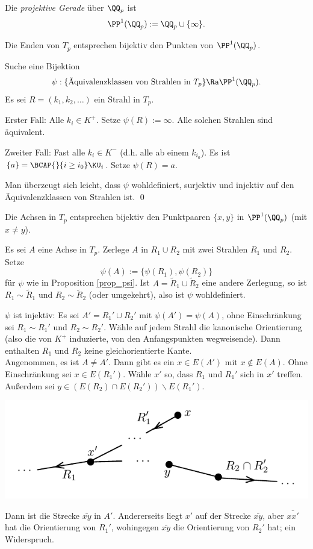 \DEF Die \emph{projektive Gerade}
über $\QQ_p$ ist
\[
\PP^1(\QQ_p):=\QQ_p\cup\{\infty\}.
\]

\PROP\label{prop_psi}
Die Enden von $T_p$ entsprechen bijektiv den Punkten von
$\PP^1(\QQ_p)$.

\bew Suche eine Bijektion
\[
\psi:\{\text{Äquivalenzklassen von Strahlen in $T_p$}\}
\Ra \PP^1(\QQ_p).
\]
Es sei $R=(k_1,k_2,\ldots)$ ein Strahl in $T_p$.

Erster Fall: Alle $k_i\in K^+$. Setze $\psi(R):=\infty$.
Alle solchen Strahlen sind äquivalent.

Zweiter Fall: Fast alle $k_i\in K^-$ (d.h. alle ab einem $k_{i_0}$).
Es ist $\{a\}=\BCAP{}{i\geq i_0} \KU_i$.
Setze $\psi(R)=a$.

Man überzeugt sich leicht, dass $\psi$ wohldefiniert, surjektiv und
injektiv auf den Äquivalenzklassen von Strahlen ist.
\qed

\BEM
Die Achsen in $T_p$ entsprechen bijektiv den Punktpaaren
$\{x,y\}$ in $\PP^1(\QQ_p)$ (mit $x\neq y$).

\bew Es sei $A$ eine Achse in $T_p$. Zerlege $A$ in $R_1\cup R_2$
mit zwei Strahlen $R_1$ und $R_2$. Setze
\[
\psi(A) := \{\psi(R_1),\psi(R_2)\}
\]
für $\psi$ wie in Proposition \ref{prop_psi}.
Ist $A=\tilde{R}_1\cup\tilde{R}_2$ eine andere Zerlegung, so ist
$R_1\sim \tilde{R}_1$ und $R_2\sim\tilde{R}_2$ (oder umgekehrt),
also ist $\psi$ wohldefiniert.

$\psi$ ist injektiv: Es sei $A'=R_1'\cup R_2'$ mit
$\psi(A')=\psi(A)$, ohne Einschränkung sei $R_1\sim R_1'$ und
$R_2\sim R_2'$.
Wähle auf jedem Strahl die kanonische Orientierung (also die von
$K^+$ induzierte, von den Anfangspunkten wegweisende).
Dann enthalten $R_1$ und $R_2$ keine gleichorientierte Kante.\\
Angenommen, es ist $A\neq A'$. Dann gibt es ein $x\in E(A')$ mit
$x\not\in E(A)$. Ohne Einschränkung sei $x\in E(R_1')$.
Wähle $x'$ so, dass $R_1$ und $R_1'$ sich in $x'$ treffen.
Außerdem sei $y\in (E(R_2)\cap E(R_2'))\backslash E(R_1')$.
\begin{center}
	\includegraphics{grugraImages/strahlen}
\end{center}
Dann ist die Strecke $\bar{xy}$ in $A'$. Andererseits liegt $x'$
auf der Strecke $\bar{xy}$, aber $\bar{xx'}$ hat die Orientierung
von $R_1'$, wohingegen $\bar{xy}$ die Orientierung von $R_2'$ hat;
ein Widerspruch.

